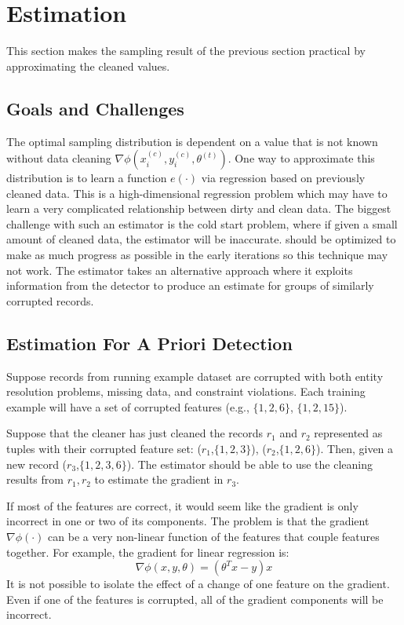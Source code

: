 \section{Estimation}\label{sampling}
This section makes the sampling result of the previous section practical by approximating the cleaned values.

\subsection{Goals and Challenges}
The optimal sampling distribution is dependent on a value that is not known without data cleaning $\nabla\phi(x^{(c)}_i,y^{(c)}_i,\theta^{(t)})$.
One way to approximate this distribution is to learn a function $e(\cdot)$ via regression based on previously cleaned data.
This is a high-dimensional regression problem which may have to learn a very complicated relationship between dirty and clean data.
The biggest challenge with such an estimator is the cold start problem, where if given a small amount of cleaned data, the estimator will be inaccurate.
\sys should be optimized to make as much progress as possible in the early iterations so this technique may not work.
The estimator takes an alternative approach where it exploits information from the detector to produce an estimate for groups of similarly corrupted records.

\subsection{Estimation For A Priori Detection}
\begin{example}
Suppose records from running example dataset are corrupted with both entity resolution problems, missing data, and constraint violations. 
Each training example will have a set of corrupted features (e.g., $\{1,2,6\}$, $\{1,2,15\}$).

Suppose that the cleaner has just cleaned the records $r_1$ and $r_2$ represented as tuples with their corrupted feature set: ($r_1$,$\{1,2,3\}$), ($r_2$,$\{1,2,6\}$).
Then, given a new record ($r_3$,$\{1,2,3,6\}$). 
The estimator should be able to use the cleaning results from $r_1,r_2$ to estimate the gradient in $r_3$.
\end{example}

If most of the features are correct, it would seem like the gradient is only
incorrect in one or two of its components.
The problem is that the gradient $\nabla\phi(\cdot)$ can be a very non-linear function of the features that couple features together.
For example, the gradient for linear regression is:
\[
\nabla\phi(x,y,\theta) = (\theta^Tx - y)x
\]
It is not possible to isolate the effect of a change of one feature on the gradient.
Even if one of the features is corrupted, all of the gradient components will be incorrect.

